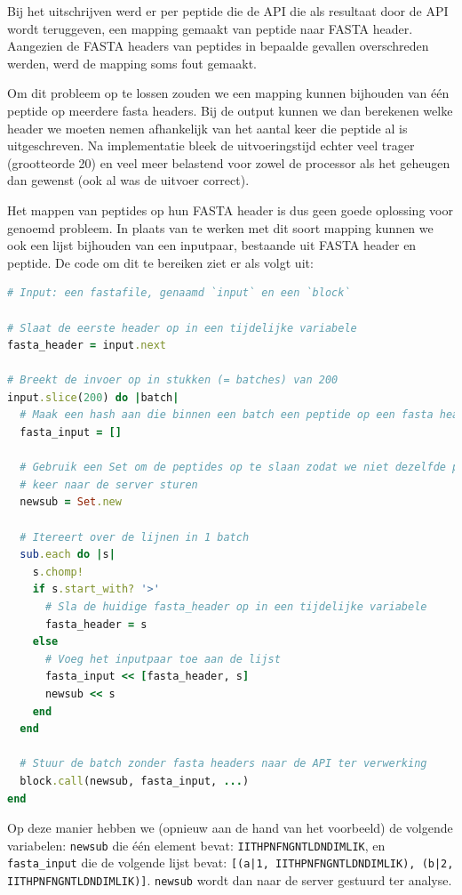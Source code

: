 Bij het uitschrijven werd er per peptide die de API die als resultaat door de 
API wordt teruggeven, een mapping 
gemaakt van peptide naar FASTA header. Aangezien de FASTA headers van 
peptides in bepaalde gevallen overschreden werden, werd de mapping soms fout 
gemaakt.

Om dit probleem op te lossen zouden we een mapping kunnen bijhouden van één
peptide op meerdere fasta headers. Bij de output kunnen we dan berekenen welke
header we moeten nemen afhankelijk van het aantal keer die peptide al is
uitgeschreven. Na implementatie bleek de uitvoeringstijd echter veel trager
(grootteorde 20) en veel meer belastend voor zowel de processor als het geheugen
dan gewenst (ook al was de uitvoer correct).

Het mappen van peptides op hun FASTA header is dus geen goede oplossing voor
genoemd probleem. In plaats van te werken met dit soort mapping kunnen we ook 
een lijst
bijhouden van een inputpaar, bestaande uit FASTA header en peptide. De code om
dit te bereiken ziet er als volgt uit:

\begin{lstlisting}[language=Ruby]
# Input: een fastafile, genaamd `input` en een `block`

# Slaat de eerste header op in een tijdelijke variabele
fasta_header = input.next

# Breekt de invoer op in stukken (= batches) van 200
input.slice(200) do |batch|
  # Maak een hash aan die binnen een batch een peptide op een fasta header mapt
  fasta_input = []
  
  # Gebruik een Set om de peptides op te slaan zodat we niet dezelfde peptide 2 
  # keer naar de server sturen 
  newsub = Set.new
  
  # Itereert over de lijnen in 1 batch
  sub.each do |s|
    s.chomp!
    if s.start_with? '>'
      # Sla de huidige fasta_header op in een tijdelijke variabele
      fasta_header = s
    else
      # Voeg het inputpaar toe aan de lijst
      fasta_input << [fasta_header, s]
      newsub << s
    end
  end
  
  # Stuur de batch zonder fasta headers naar de API ter verwerking
  block.call(newsub, fasta_input, ...)
end
\end{lstlisting}

Op deze manier hebben we (opnieuw aan de hand van het voorbeeld) de volgende 
variabelen: \texttt{newsub} die één element bevat: 
\texttt{IITHPNFNGNTLDNDIMLIK}, en \texttt{fasta\_input} die de volgende lijst 
bevat: \texttt{[(a|1, IITHPNFNGNTLDNDIMLIK), (b|2, IITHPNFNGNTLDNDIMLIK)]}. 
\texttt{newsub} wordt dan naar de server gestuurd ter analyse.

